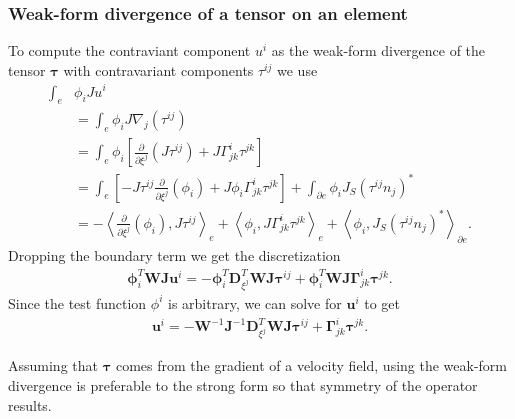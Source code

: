 \documentclass{report}
\newcommand{\inner}[2]{ \left\langle #1, #2 \right\rangle }
\newcommand{\mat}[1]{\boldsymbol #1}
\newcommand{\dvec}[1]{\boldsymbol #1}
\begin{document}
\subsubsection*{Weak-form divergence of a tensor on an element}
To compute the contraviant component $u^{i}$ as the weak-form
divergence of the tensor $\mat{\tau}$  with contravariant
components $\tau^{ij}$
we use
\begin{align}
  \int_{e} &\phi_{i}J u^{i}\nonumber\\
  &=
  \int_{e} \phi_{i}J \nabla_{j}\left(\tau^{ij}\right)\nonumber\\
  &=
  \int_{e} \phi_{i}\left[
  \frac{\partial}{\partial \xi^{j}}\left(J\tau^{ij}\right)
  +
  J \Gamma_{jk}^{i} \tau^{jk}
  \right]\nonumber\\
  &=
  \int_{e} \left[-
  J \tau^{ij}
  \frac{\partial}{\partial \xi^{j}}\left(
  \phi_{i}
  \right)
  +
  J\phi_{i} \Gamma_{jk}^{i} \tau^{jk}
  \right]
  +
  \int_{\partial e }
  \phi_{i} J_{S} {\left(\tau^{ij} n_{j}\right)}^{*}
  \nonumber\\
  &=
  -\inner{
  \frac{\partial}{\partial \xi^{j}}\left(
  \phi_{i}
  \right)
  }{
  J \tau^{ij}
  }_{e}
  +
  \inner{\phi_{i}}{J \Gamma_{jk}^{i} \tau^{jk}}_{e}
  +
  \inner{\phi_{i}}{J_{S} {\left(\tau^{ij} n_{j}\right)}^{*}}_{\partial e}.
\end{align}
Dropping the boundary term we get the discretization
\begin{align}
  \dvec{\phi}_{i}^{T} \mat{W} \mat{J} \dvec{u}^{i}
  =
  -\dvec{\phi}_{i}^{T} \mat{D}_{\xi^j}^{T} \mat{W} \mat{J} \dvec{\tau}^{ij}
  +
  \dvec{\phi}_{i}^{T} \mat{W} \mat{J} \mat{\Gamma}^{i}_{jk} \dvec{\tau}^{jk}.
\end{align}
Since the test function $\phi^{i}$ is arbitrary, we can solve for
$\dvec{u}^{i}$ to get
\begin{align}
  \dvec{u}^{i}
  =
  -\mat{W}^{-1} \mat{J}^{-1} \mat{D}_{\xi^j}^{T} \mat{W} \mat{J} \dvec{\tau}^{ij}
  +
  \mat{\Gamma}^{i}_{jk} \dvec{\tau}^{jk}.
\end{align}

Assuming that $\mat{\tau}$ comes from the gradient of a velocity field,
using the weak-form divergence is preferable to the strong form so that
symmetry of the operator results.
\end{document}
